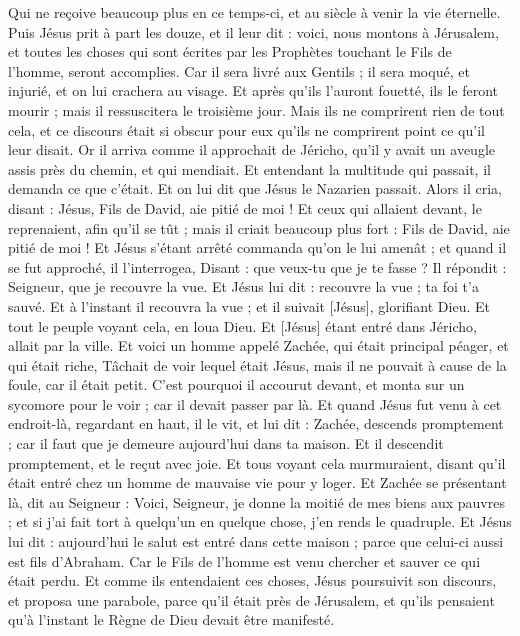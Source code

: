 \begin{multicols}{2}
Qui ne reçoive beaucoup plus en ce temps-ci, et au siècle à venir la vie éternelle.
Puis Jésus prit à part les douze, et il leur dit : voici, nous montons à Jérusalem, et toutes les choses qui sont écrites par les Prophètes touchant le Fils de l'homme, seront accomplies.
Car il sera livré aux Gentils ; il sera moqué, et injurié, et on lui crachera au visage.
Et après qu'ils l'auront fouetté, ils le feront mourir ; mais il ressuscitera le troisième jour.
Mais ils ne comprirent rien de tout cela, et ce discours était si obscur pour eux qu'ils ne comprirent point ce qu'il leur disait.
Or il arriva comme il approchait de Jéricho, qu'il y avait un aveugle assis près du chemin, et qui mendiait.
Et entendant la multitude qui passait, il demanda ce que c'était.
Et on lui dit que Jésus le Nazarien passait.
Alors il cria, disant : Jésus, Fils de David, aie pitié de moi !
Et ceux qui allaient devant, le reprenaient, afin qu'il se tût ; mais il criait beaucoup plus fort : Fils de David, aie pitié de moi !
Et Jésus s'étant arrêté commanda qu'on le lui amenât ; et quand il se fut approché, il l'interrogea,
Disant : que veux-tu que je te fasse ? Il répondit : Seigneur, que je recouvre la vue.
Et Jésus lui dit : recouvre la vue ; ta foi t'a sauvé.
Et à l'instant il recouvra la vue ; et il suivait [Jésus], glorifiant Dieu. Et tout le peuple voyant cela, en loua Dieu.
\VerseOne{}Et [Jésus] étant entré dans Jéricho, allait par la ville.
Et voici un homme appelé Zachée, qui était principal péager, et qui était riche,
Tâchait de voir lequel était Jésus, mais il ne pouvait à cause de la foule, car il était petit.
C'est pourquoi il accourut devant, et monta sur un sycomore pour le voir ; car il devait passer par là.
Et quand Jésus fut venu à cet endroit-là, regardant en haut, il le vit, et lui dit : Zachée, descends promptement ; car il faut que je demeure aujourd'hui dans ta maison.
Et il descendit promptement, et le reçut avec joie.
Et tous voyant cela murmuraient, disant qu'il était entré chez un homme de mauvaise vie pour y loger.
Et Zachée se présentant là, dit au Seigneur : Voici, Seigneur, je donne la moitié de mes biens aux pauvres ; et si j'ai fait tort à quelqu'un en quelque chose, j'en rends le quadruple.
Et Jésus lui dit : aujourd'hui le salut est entré dans cette maison ; parce que celui-ci aussi est fils d'Abraham.
Car le Fils de l'homme est venu chercher et sauver ce qui était perdu.
Et comme ils entendaient ces choses, Jésus poursuivit son discours, et proposa une parabole, parce qu'il était près de Jérusalem, et qu'ils pensaient qu'à l'instant le Règne de Dieu devait être manifesté.

\end{multicols}
